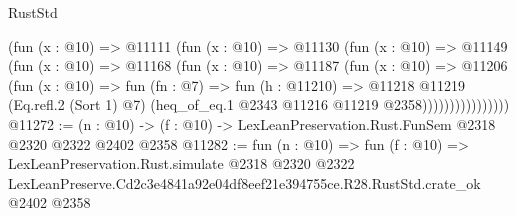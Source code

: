 \begin{lexlean}{RustStd}
\begin{coremodule}
                    (fun (x : @10) =>
                    @11111
                      (fun (x : @10) =>
                      @11130
                        (fun (x : @10) =>
                        @11149
                          (fun (x : @10) =>
                          @11168
                            (fun (x : @10) =>
                            @11187
                              (fun (x : @10) =>
                              @11206
                                (fun (x : @10) =>
                                fun (fn : @7) =>
                                fun (h : @11210) =>
                                @11218
                                  @11219
                                  (Eq.refl.{2} (Sort 1) @7)
                                  (heq_of_eq.{1} @2343 @11216 @11219 @2358))))))))))))))))
@11272 := (n : @10) -> (f : @10) -> LexLeanPreservation.Rust.FunSem @2318 @2320 @2322 @2402 @2358
@11282 := fun (n : @10) =>
  fun (f : @10) =>
  LexLeanPreservation.Rust.simulate
    @2318
    @2320
    @2322
    LexLeanPreserve.Cd2c3e4841a92e04df8eef21e394755ce.R28.RustStd.crate_ok
    @2402
    @2358
\end{coremodule}
\end{lexlean}
